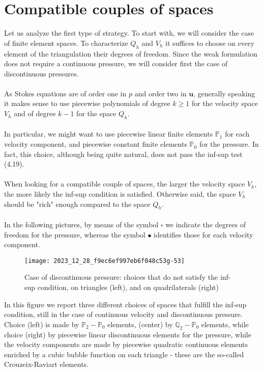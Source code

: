 \documentclass[11pt]{book}
\begin{document}
\section{Compatible couples of spaces}
Let us analyze the first type of strategy. To start with, we will consider the case of finite element spaces. To characterize $Q_{h}$ and $V_{h}$ it suffices to choose on every element of the triangulation their degrees of freedom. Since the weak formulation does not require a continuous pressure, we will consider first the case of discontinuous pressures. \\ \\
As Stokes equations are of order one in $p$ and order two in $\mathbf{u}$, generally speaking it makes sense to use piecewise polynomials of degree $k \geq 1$ for the velocity space $V_{h}$ and of degree $k-1$ for the space $Q_{h}$.\\ \\
In particular, we might want to use piecewise linear finite elements $\mathbb{P}_{1}$ for each velocity component, and piecewise constant finite elements $\mathbb{P}_{0}$ for the pressure. In fact, this choice, although being quite natural, does not pass the inf-sup test (4.19).\\ \\
When looking for a compatible couple of spaces, the larger the velocity space $V_{h}$, the more likely the inf-sup condition is satisfied. Otherwise said, the space $V_{h}$ should be "rich" enough compared to the space $Q_{h}$.\\ \\
In the following pictures, by means of the symbol $\square$ we indicate the degrees of freedom for the pressure, whereas the symbol $\bullet$ identifies those for each velocity component.

\begin{figure}[ht]
    \centering
    \texttt{[image: 2023\_12\_28\_f9ec6ef997eb6f048c53g-53]}
    \caption{Case of discontinuous pressure: choices that do not satisfy the inf-sup condition, on triangles (left), and on quadrilaterals (right)}
    \label{fig:discontinuous-pressure}
\end{figure}
\noindent In this figure we report three different choices of spaces that fulfill the inf-sup condition, still in the case of continuous velocity and discontinuous pressure. Choice (left) is made by $\mathbb{P}_{2}-\mathbb{P}_{0}$ elements, (center) by $\mathbb{Q}_{2}-\mathbb{P}_{0}$ elements, while choice (right) by piecewise linear discontinuous elements for the pressure, while the velocity components are made by piecewise quadratic continuous elements enriched by a cubic bubble function on each triangle - these are the so-called Crouzeix-Raviart elements.
\end{document}
